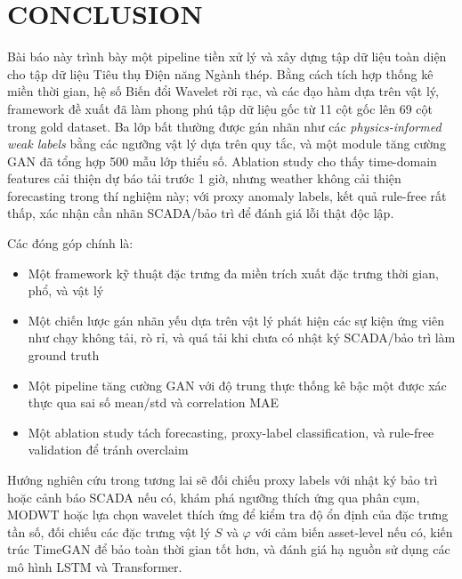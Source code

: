 \section{CONCLUSION}
\label{sec:conclusion}

Bài báo này trình bày một pipeline tiền xử lý và xây dựng tập dữ liệu toàn diện
cho tập dữ liệu Tiêu thụ Điện năng Ngành thép.
Bằng cách tích hợp thống kê miền thời gian, hệ số Biến đổi Wavelet rời rạc,
và các đạo hàm dựa trên vật lý, framework đề xuất đã làm phong phú tập dữ liệu gốc
từ 11 cột gốc lên 69 cột trong gold dataset.
Ba lớp bất thường được gán nhãn như các \textit{physics-informed weak labels} bằng các ngưỡng vật lý dựa trên quy tắc,
và một module tăng cường GAN đã tổng hợp 500 mẫu lớp thiểu số.
Ablation study cho thấy time-domain features cải thiện dự báo tải trước 1 giờ,
nhưng weather không cải thiện forecasting trong thí nghiệm này; với proxy anomaly labels,
kết quả rule-free rất thấp, xác nhận cần nhãn SCADA/bảo trì để đánh giá lỗi thật độc lập.

Các đóng góp chính là:
\begin{itemize}
\item Một framework kỹ thuật đặc trưng đa miền trích xuất đặc trưng thời gian, phổ, và vật lý
\item Một chiến lược gán nhãn yếu dựa trên vật lý phát hiện các sự kiện ứng viên như chạy không tải, rò rỉ, và quá tải khi chưa có nhật ký SCADA/bảo trì làm ground truth
\item Một pipeline tăng cường GAN với độ trung thực thống kê bậc một được xác thực qua sai số mean/std và correlation MAE
\item Một ablation study tách forecasting, proxy-label classification, và rule-free validation để tránh overclaim
\end{itemize}

Hướng nghiên cứu trong tương lai sẽ đối chiếu proxy labels với nhật ký bảo trì hoặc cảnh báo SCADA nếu có,
khám phá ngưỡng thích ứng qua phân cụm,
MODWT hoặc lựa chọn wavelet thích ứng để kiểm tra độ ổn định của đặc trưng tần số,
đối chiếu các đặc trưng vật lý $S$ và $\varphi$ với cảm biến asset-level nếu có,
kiến trúc TimeGAN để bảo toàn thời gian tốt hơn,
và đánh giá hạ nguồn sử dụng các mô hình LSTM và Transformer.

